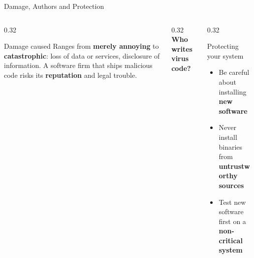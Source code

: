 \documentclass[aspectratio=169,11pt,xcolor={table}]{beamer}
\begin{document}
\begin{frame}{Damage, Authors and Protection}
  \begin{columns}[T]
    \begin{column}{0.32\textwidth}
      \begin{alertblock}{Damage caused}
        \small Ranges from \textbf{merely annoying} to \textbf{catastrophic}: loss of data or services, disclosure of information. A software firm that ships malicious code risks its \textbf{reputation} and legal trouble.
      \end{alertblock}
    \end{column}
    \begin{column}{0.32\textwidth}
      \centering\textbf{\textcolor{brick}{Who writes virus code?}}\\[2mm]
    \end{column}
    \begin{column}{0.32\textwidth}
      \begin{exampleblock}{Protecting your system}
        \small
        \begin{itemize}\setlength{\itemsep}{2pt}
          \item Be careful about installing \textbf{new software}
          \item Never install binaries from \textbf{untrustworthy sources}
          \item Test new software first on a \textbf{non-critical system}
        \end{itemize}
      \end{exampleblock}
    \end{column}
  \end{columns}
\end{frame}
\end{document}

